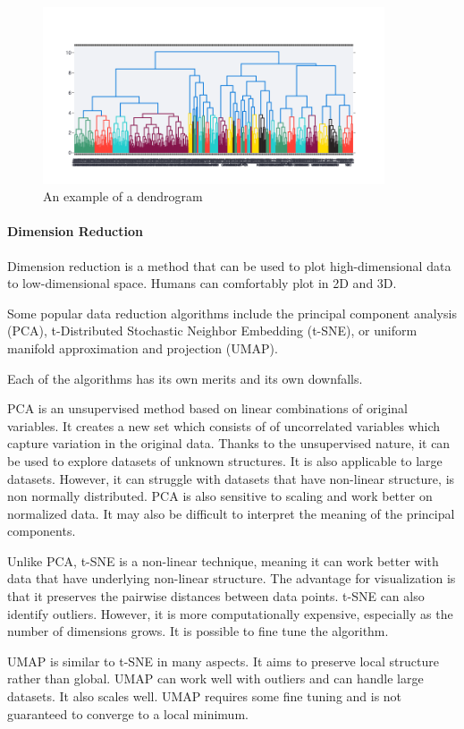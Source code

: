 \begin{figure}[h!]
    \centering
    \includegraphics[width=0.9\textwidth]{Figures/dendrogramex.png}
    \caption{An example of a dendrogram}
    \label{fig:exdendr}
\end{figure}

\paragraph{Dimension Reduction}
\label{sec:dimred}
Dimension reduction is a method that can be used to plot high-dimensional data to low-dimensional space. Humans can comfortably plot in 2D and 3D. 

Some popular data reduction algorithms include the principal component analysis (PCA), t-Distributed Stochastic Neighbor Embedding (t-SNE), or uniform manifold approximation and projection (UMAP).

Each of the algorithms has its own merits and its own downfalls.

PCA is an unsupervised method based on linear combinations of original variables. It creates a new set which consists of of uncorrelated variables which capture variation in the original data. Thanks to the unsupervised nature, it can be used to explore datasets of unknown structures. It is also applicable to large datasets. However, it can struggle with datasets that have non-linear structure, is non normally distributed. PCA is also sensitive to scaling and work better on normalized data. It may also be difficult to interpret the meaning of the principal components. 

Unlike PCA, t-SNE is a non-linear technique, meaning it can work better with data that have underlying non-linear structure. The advantage for visualization is that it preserves the pairwise distances between data points. t-SNE can also identify outliers. However, it is more computationally expensive, especially as the number of dimensions grows. It is possible to fine tune the algorithm. 

UMAP is similar to t-SNE in many aspects. It aims to preserve local structure rather than global. UMAP can work well with outliers and can handle large datasets. It also scales well. UMAP requires some fine tuning and is not guaranteed to converge to a local minimum.

